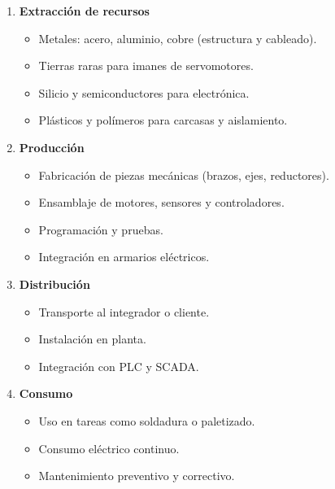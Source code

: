 

\begin{solution}


\begin{enumerate}
    \item \textbf{Extracción de recursos}
    \begin{itemize}
        \item Metales: acero, aluminio, cobre (estructura y cableado).
        \item Tierras raras para imanes de servomotores.
        \item Silicio y semiconductores para electrónica.
        \item Plásticos y polímeros para carcasas y aislamiento.
    \end{itemize}

    \item \textbf{Producción}
    \begin{itemize}
        \item Fabricación de piezas mecánicas (brazos, ejes, reductores).
        \item Ensamblaje de motores, sensores y controladores.
        \item Programación y pruebas.
        \item Integración en armarios eléctricos.
    \end{itemize}

    \item \textbf{Distribución}
    \begin{itemize}
        \item Transporte al integrador o cliente.
        \item Instalación en planta.
        \item Integración con PLC y SCADA.
    \end{itemize}

    \item \textbf{Consumo}
    \begin{itemize}
        \item Uso en tareas como soldadura o paletizado.
        \item Consumo eléctrico continuo.
        \item Mantenimiento preventivo y correctivo.
    \end{itemize}


\end{enumerate}
\end{solution}
